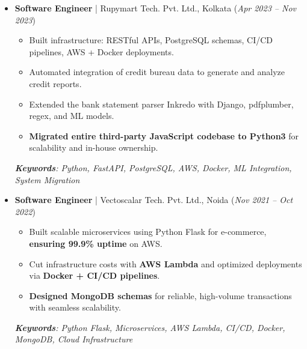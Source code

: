\documentclass[10pt]{extarticle}
\newcommand{\driveicon}[1]{\href{#1}{\faGoogleDrive}}
\newcommand{\exticon}[1]{\href{#1}{\small \faLink}}
\begin{document}
\begin{itemize}[itemsep=4pt]
    \item \textbf{Software Engineer} | Rupymart Tech. Pvt. Ltd., Kolkata \hfill (\textit{Apr 2023 -- Nov 2023})  
    \begin{itemize}[left=10pt]
        \item Built infrastructure: RESTful APIs, PostgreSQL schemas, CI/CD pipelines, AWS + Docker deployments.  
        \item Automated integration of credit bureau data to generate and analyze credit reports.  
        \item Extended the bank statement parser \exticon{https://home.inkredo.in/} Inkredo with Django, pdfplumber, regex, and ML models.  
        \item \textbf{Migrated entire third-party JavaScript codebase to Python3} for scalability and in-house ownership.  
    \end{itemize}
    \textit{\textbf{Keywords}: Python, FastAPI, PostgreSQL, AWS, Docker, ML Integration, System Migration}  

    \item \textbf{Software Engineer} | Vectoscalar Tech. Pvt. Ltd., Noida \hfill (\textit{Nov 2021 -- Oct 2022})  
    \begin{itemize}[left=10pt]
        \item Built scalable microservices using Python Flask for e-commerce, \textbf{ensuring 99.9\% uptime} on AWS.  
        \item Cut infrastructure costs with \textbf{AWS Lambda} and optimized deployments via \textbf{Docker + CI/CD pipelines}.  
        \item \textbf{Designed MongoDB schemas} for reliable, high-volume transactions with seamless scalability.  
    \end{itemize}
    \textit{\textbf{Keywords}: Python Flask, Microservices, AWS Lambda, CI/CD, Docker, MongoDB, Cloud Infrastructure}  

\end{itemize}
\vspace{-10pt}
\end{document}
